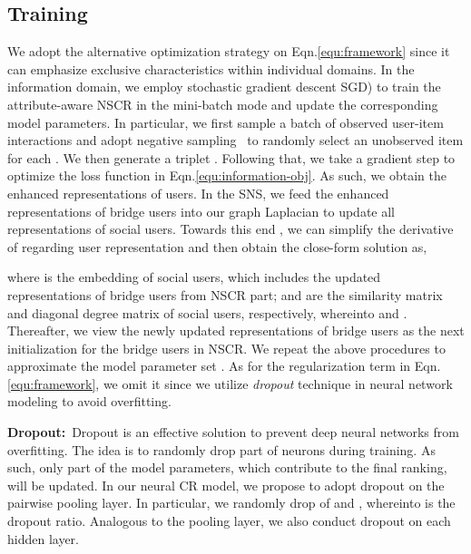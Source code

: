 \documentclass[sigconf]{acmart}
\begin{document}
\subsection{Training}
We adopt the alternative optimization strategy on Eqn.\eqref{equ:framework} since it can emphasize exclusive characteristics within individual domains. In the information domain, we employ stochastic gradient descent SGD) to train the attribute-aware NSCR in the mini-batch mode and update the corresponding model parameters. In particular, we first sample a batch of observed user-item interactions  and adopt negative sampling~\cite{heneural} to randomly select an unobserved item  for each . We then generate a triplet . Following that, we take a gradient step to optimize the loss function  in Eqn.\eqref{equ:information-obj}. As such, we obtain the enhanced representations of users. In the SNS, we feed the enhanced representations of bridge users into our graph Laplacian to update all representations of social users. Towards this end , we can simplify the derivative of  regarding user representation  and then obtain the close-form solution as,

where  is the embedding of social users, which includes the updated representations of bridge users from NSCR part;  and  are the similarity matrix and diagonal degree matrix of social users, respectively, whereinto  and . Thereafter, we view the newly updated representations of bridge users as the next initialization for the bridge users in NSCR. We repeat the above procedures to approximate the model parameter set . As for the regularization term in Eqn.\eqref{equ:framework}, we omit it since we utilize \emph{dropout} technique in neural network modeling to avoid overfitting.



\textbf{Dropout:}~Dropout is an effective solution to prevent deep neural networks from overfitting. The idea is to randomly drop part of neurons during training. As such, only part of the model parameters, which contribute to the final ranking, will be updated. In our neural CR model, we propose to adopt dropout on the pairwise pooling layer. In particular, we randomly drop  of  and , whereinto  is the dropout ratio. Analogous to the pooling layer, we also conduct dropout on each hidden layer.
\end{document}
